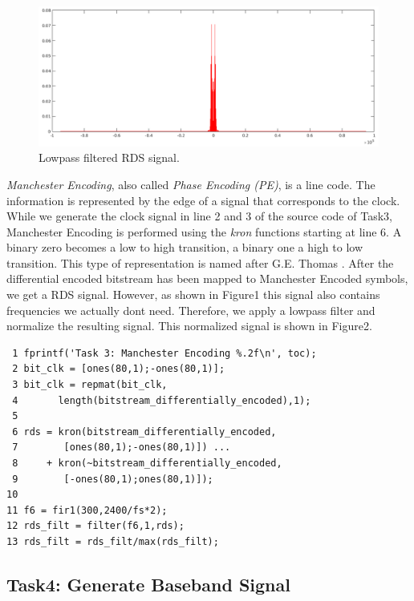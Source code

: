 \documentclass[sigconf]{acmart}
\begin{document}
\begin{figure}[tb!]
	\includegraphics[width=1\linewidth]{rds_filt_plot.png}
	\caption{Lowpass filtered RDS signal.}
	\label{fig:rds_filt_plot}
\end{figure}

\emph{Manchester Encoding}, also called
\protect\hypertarget{Phaseux20Encodingux20ux28PEux29}{}{}\textit{Phase
Encoding (PE)}, is a line code. The information is represented by the
edge of a signal that corresponds to the clock. While we generate the clock signal in line 2 and 3
of the source code of Task3, Manchester Encoding is performed using the \textit{kron} functions starting at
line 6. A binary zero becomes a low to high transition, a
binary one a high to low transition. This type of representation is
named after G.E. Thomas \cite{tanenbaum1996computer}. After the differential encoded bitstream has
been mapped to Manchester Encoded symbols, we get a RDS signal. However,
as shown in Figure1 this signal also contains frequencies we actually
dont need. Therefore, we apply a lowpass filter and normalize the
resulting signal. This normalized signal is shown in Figure2.

\begin{verbatim}
 1 fprintf('Task 3: Manchester Encoding %.2f\n', toc);
 2 bit_clk = [ones(80,1);-ones(80,1)];
 3 bit_clk = repmat(bit_clk,
 4	     length(bitstream_differentially_encoded),1);
 5 
 6 rds = kron(bitstream_differentially_encoded, 
 7 	      [ones(80,1);-ones(80,1)]) ...
 8     + kron(~bitstream_differentially_encoded, 
 9	      [-ones(80,1);ones(80,1)]);
10 
11 f6 = fir1(300,2400/fs*2);
12 rds_filt = filter(f6,1,rds);
13 rds_filt = rds_filt/max(rds_filt);
\end{verbatim}

\hypertarget{Task4:ux20Generateux20Basebandux20Signal}{%
\subsection{Task4: Generate Baseband
Signal}\label{Task4:ux20Generateux20Basebandux20Signal}}
\end{document}
